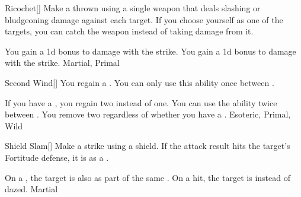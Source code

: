 \lowercase{\hypertarget{maneuver:Ricochet}{}}\label{maneuver:Ricochet}
\hypertarget{maneuver:Ricochet}{}
\begin{freeability}[Rank 3]{Ricochet}[]
Make a thrown  using a single weapon that deals slashing or bludgeoning damage against each target.
If you choose yourself as one of the targets, you can catch the weapon instead of taking damage from it.

\rankline
{} You gain a \plus1d bonus to damage with the strike.
 You gain a \plus1d bonus to damage with the strike.
 Martial, Primal
\end{freeability}
\vspace{0.25em}



\lowercase{\hypertarget{maneuver:Second Wind}{}}\label{maneuver:Second Wind}
\hypertarget{maneuver:Second Wind}{}
\begin{freeability}[Rank 1]{Second Wind}[]
You regain a .
You can only use this ability once between .

\rankline
{} If you have a , you regain two  instead of one.
 You can use the ability twice between .
 You remove two  regardless of whether you have a .
 Esoteric, Primal, Wild
\end{freeability}
\vspace{0.25em}



\lowercase{\hypertarget{maneuver:Shield Slam}{}}\label{maneuver:Shield Slam}
\hypertarget{maneuver:Shield Slam}{}
\begin{freeability}[Rank 3]{Shield Slam}[]
Make a strike using a shield.
If the attack result hits the target's Fortitude defense,
it is  as a .

\rankline
{} On a , the target is also  as part of the same .
 On a hit, the target is  instead of dazed.
 Martial
\end{freeability}
\vspace{0.25em}



